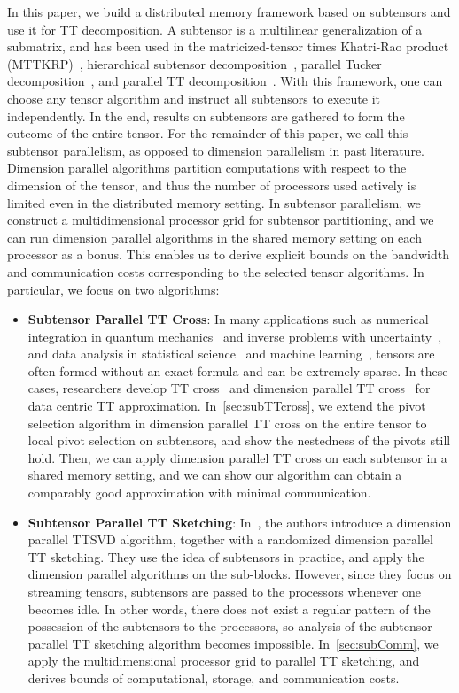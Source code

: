 \documentclass[11pt,a4paper,review]{siamart220329}
\begin{document}
In this paper, we build a distributed memory framework based on subtensors and use it for TT decomposition. A subtensor is a multilinear generalization of a submatrix, and has been used in the matricized-tensor times Khatri-Rao product (MTTKRP)~\cite{ballard2018, ballard2020}, hierarchical subtensor decomposition~\cite{ehrlacher2021}, parallel Tucker decomposition~\cite{ballard2020tuckermpi}, and parallel TT decomposition~\cite{shi2023parallel}. With this framework, one can choose any tensor algorithm and instruct all subtensors to execute it independently. In the end, results on subtensors are gathered to form the outcome of the entire tensor. For the remainder of this paper, we call this subtensor parallelism, as opposed to dimension parallelism in past literature. Dimension parallel algorithms partition computations with respect to the dimension of the tensor, and thus the number of processors used actively is limited even in the distributed memory setting. In subtensor parallelism, we construct a multidimensional processor grid for subtensor partitioning, and we can run dimension parallel algorithms in the shared memory setting on each processor as a bonus. This enables us to derive explicit bounds on the bandwidth and communication costs corresponding to the selected tensor algorithms. In particular, we focus on two algorithms:
\begin{itemize}[leftmargin=*,noitemsep]
\item \textbf{Subtensor Parallel TT Cross}: In many applications such as numerical integration in quantum mechanics~\cite{meyer1990multi} and inverse problems with uncertainty~\cite{stuart2010inverse}, and data analysis in statistical science~\cite{mccullagh2018tensor} and machine learning~\cite{rabanser2017introduction}, tensors are often formed without an exact formula and can be extremely sparse. In these cases, researchers develop TT cross~\cite{oseledets2010tt} and dimension parallel TT cross~\cite{dolgov2020parallel} for data centric TT approximation. In~\cref{sec:subTTcross}, we extend the pivot selection algorithm in dimension parallel TT cross on the entire tensor to local pivot selection on subtensors, and show the nestedness of the pivots still hold. Then, we can apply dimension parallel TT cross on each subtensor in a shared memory setting, and we can show our algorithm can obtain a comparably good approximation with minimal communication.

\item \textbf{Subtensor Parallel TT Sketching}: In~\cite{shi2023parallel}, the authors introduce a dimension parallel TTSVD algorithm, together with a randomized dimension parallel TT sketching. They use the idea of subtensors in practice, and apply the dimension parallel algorithms on the sub-blocks. However, since they focus on streaming tensors, subtensors are passed to the processors whenever one becomes idle. In other words, there does not exist a regular pattern of the possession of the subtensors to the processors, so analysis of the subtensor parallel TT sketching algorithm becomes impossible. In~\cref{sec:subComm}, we apply the multidimensional processor grid to parallel TT sketching, and derives bounds of computational, storage, and communication costs.
\end{itemize}
\end{document}
